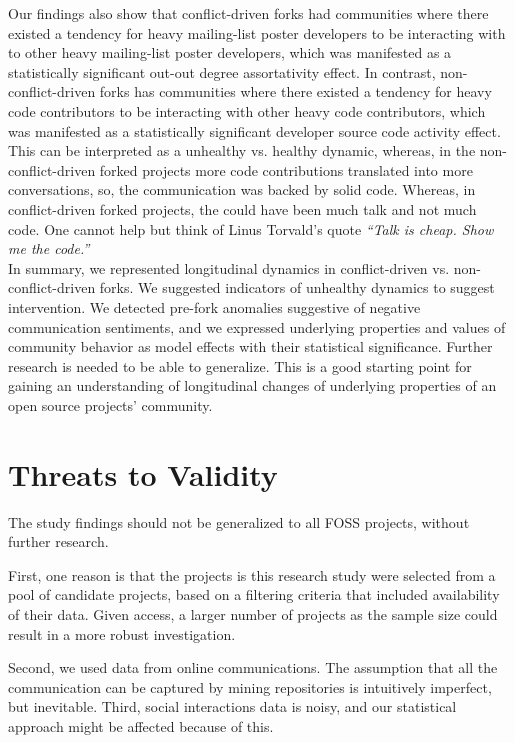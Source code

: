 \documentclass[12pt]{report}
\begin{document}
Our findings also show that conflict-driven forks had communities where there existed a tendency for heavy mailing-list poster developers to be interacting with to other heavy mailing-list poster developers, which was manifested as a statistically significant out-out degree assortativity effect. In contrast, non-conflict-driven forks has communities where there existed a tendency for heavy code contributors to be interacting with other heavy code contributors, which was manifested as a statistically significant developer source code activity effect. This can be interpreted as a unhealthy vs. healthy dynamic, whereas, in the non-conflict-driven forked projects more code contributions translated into more conversations, so, the communication was backed by solid code. Whereas, in conflict-driven forked projects, the could have been much talk and not much code. One cannot help but think of Linus Torvald's quote \textit{``Talk is cheap. Show me the code.''}\\

In summary, we represented longitudinal dynamics in conflict-driven vs. non-conflict-driven forks. We suggested indicators of unhealthy dynamics to suggest intervention. We detected pre-fork anomalies suggestive of negative communication sentiments, and we expressed underlying properties and values of community behavior as model effects with their statistical significance. Further research is needed to be able to generalize. This is a good starting point for gaining an understanding of longitudinal changes of underlying properties of an open source projects' community.\\




\pagebreak

\section{Threats to Validity}
\label{threatsToValidity}


The study findings should not be generalized to all FOSS projects, without further research. 

First, one reason is that the projects is this research study were selected from a pool of candidate projects, based on a filtering criteria that included availability of their data. Given access, a larger number of projects as the sample size could result in a more robust investigation. 

Second, we used data from online communications. The assumption that all the communication can be captured by mining repositories is intuitively imperfect, but inevitable. Third, social interactions data is noisy, and our statistical approach might be affected because of this. 
\end{document}

